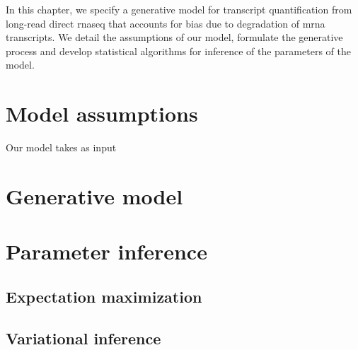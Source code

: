 
In this chapter, we specify a generative model for transcript quantification from long-read direct \gls{rnaseq} that accounts for bias due to degradation of \gls{mrna} transcripts. We detail the assumptions of our model, formulate the generative process and develop statistical algorithms for inference of the parameters of the model.  

\section{Model assumptions}

Our model takes as input 

\section{Generative model}

\section{Parameter inference}

\subsection{Expectation maximization}

\subsection{Variational inference}


